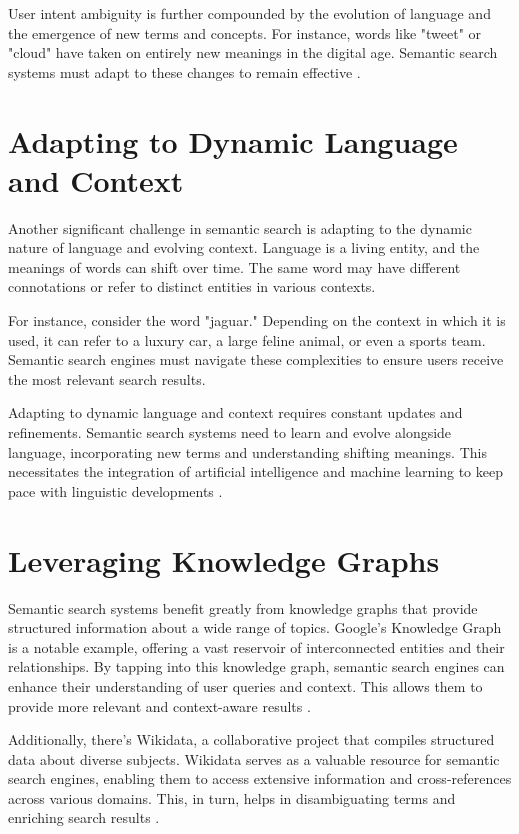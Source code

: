 \documentclass[10pt,oneside,a4paper]{article}
\begin{document}
User intent ambiguity is further compounded by the evolution of language and the emergence of new terms and concepts. For instance, words like "tweet" or "cloud" have taken on entirely new meanings in the digital age. Semantic search systems must adapt to these changes to remain effective \cite{Smith2018}.

\section{Adapting to Dynamic Language and Context}
Another significant challenge in semantic search is adapting to the dynamic nature of language and evolving context. Language is a living entity, and the meanings of words can shift over time. The same word may have different connotations or refer to distinct entities in various contexts.

For instance, consider the word "jaguar." Depending on the context in which it is used, it can refer to a luxury car, a large feline animal, or even a sports team. Semantic search engines must navigate these complexities to ensure users receive the most relevant search results.

Adapting to dynamic language and context requires constant updates and refinements. Semantic search systems need to learn and evolve alongside language, incorporating new terms and understanding shifting meanings. This necessitates the integration of artificial intelligence and machine learning to keep pace with linguistic developments \cite{Wilson2019}.

\section{Leveraging Knowledge Graphs}
Semantic search systems benefit greatly from knowledge graphs that provide structured information about a wide range of topics. Google's Knowledge Graph is a notable example, offering a vast reservoir of interconnected entities and their relationships. By tapping into this knowledge graph, semantic search engines can enhance their understanding of user queries and context. This allows them to provide more relevant and context-aware results \cite{Singhal2012}.

Additionally, there's Wikidata, a collaborative project that compiles structured data about diverse subjects. Wikidata serves as a valuable resource for semantic search engines, enabling them to access extensive information and cross-references across various domains. This, in turn, helps in disambiguating terms and enriching search results \cite{Vrandecic2014}.
\end{document}

